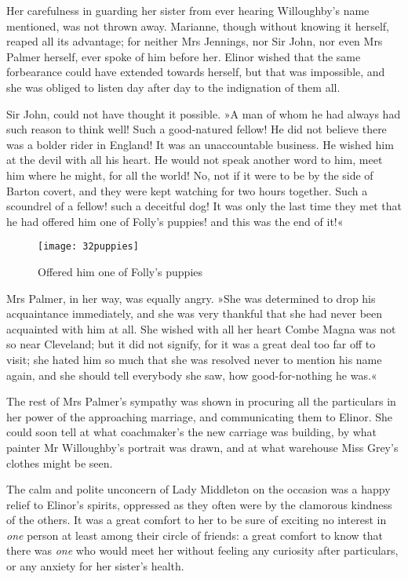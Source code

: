 Her carefulness in guarding her sister from ever hearing Willoughby’s name mentioned, was not thrown away. Marianne, though without knowing it herself, reaped all its advantage; for neither Mrs Jennings, nor Sir John, nor even Mrs Palmer herself, ever spoke of him before her. Elinor wished that the same forbearance could have extended towards herself, but that was impossible, and she was obliged to listen day after day to the indignation of them all.

Sir John, could not have thought it possible. »A man of whom he had always had such reason to think well! Such a good-natured fellow! He did not believe there was a bolder rider in England! It was an unaccountable business. He wished him at the devil with all his heart. He would not speak another word to him, meet him where he might, for all the world! No, not if it were to be by the side of Barton covert, and they were kept watching for two hours together. Such a scoundrel of a fellow! such a deceitful dog! It was only the last time they met that he had offered him one of Folly’s puppies! and this was the end of it!«

\begin{figure}[tbph]
\centering
\texttt{[image: 32puppies]}
\caption{Offered him one of Folly’s puppies}
\end{figure}

Mrs Palmer, in her way, was equally angry. »She was determined to drop his acquaintance immediately, and she was very thankful that she had never been acquainted with him at all. She wished with all her heart Combe Magna was not so near Cleveland; but it did not signify, for it was a great deal too far off to visit; she hated him so much that she was resolved never to mention his name again, and she should tell everybody she saw, how good-for-nothing he was.«

The rest of Mrs Palmer’s sympathy was shown in procuring all the particulars in her power of the approaching marriage, and communicating them to Elinor. She could soon tell at what coachmaker’s the new carriage was building, by what painter Mr Willoughby’s portrait was drawn, and at what warehouse Miss Grey’s clothes might be seen.

The calm and polite unconcern of Lady Middleton on the occasion was a happy relief to Elinor’s spirits, oppressed as they often were by the clamorous kindness of the others. It was a great comfort to her to be sure of exciting no interest in \textit{one} person at least among their circle of friends: a great comfort to know that there was \textit{one} who would meet her without feeling any curiosity after particulars, or any anxiety for her sister’s health.

